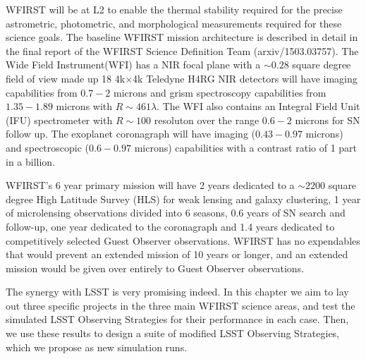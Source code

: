 WFIRST will be at L2 to enable the thermal stability required for the
precise astrometric, photometric, and morphological measurements
required for these science goals. The baseline WFIRST mission
architecture is described in detail in the final report of the WFIRST
Science Definition Team (arxiv/1503.03757). The Wide Field
Instrument(WFI) has a NIR focal plane with a $\sim0.28$ square degree
field of view made up 18 4k$\times$4k Teledyne H4RG NIR detectors will
have imaging capabilities from $0.7-2$ microns and grism spectroscopy
capabilities from $1.35-1.89$ microns with $R\sim461\lambda$.  The WFI
also contains an Integral Field Unit (IFU) spectrometer with $R\sim100$
resoluton over the range $0.6-2$ microns for SN follow up. The exoplanet
coronagraph will have imaging ($0.43-0.97$ microns) and spectroscopic
($0.6-0.97 $ microns) capabilities with a contrast ratio of 1 part in a
billion.

WFIRST's  6 year primary mission will have 2 years dedicated to a
$\sim2200$ square degree High Latitude Survey (HLS) for weak lensing and
galaxy clustering,  1 year of microlensing observations divided into 6
seasons, $0.6$ years of SN search and follow-up, one year dedicated to
the coronagraph and 1.4 years dedicated to competitively selected Guest
Observer observations. WFIRST has no expendables that would prevent an
extended mission of 10 years or longer, and an extended mission would be
given over entirely to Guest Observer observations.

The synergy with LSST is very promising indeed. In this chapter we aim
to  lay out three  specific projects in the three main WFIRST science
areas, and test the simulated LSST Observing
Strategies for their performance in each case. Then, we use these
results to design a suite of modified LSST Observing Strategies, which
we propose as new \OpSim simulation runs.





% 







\navigationbar
